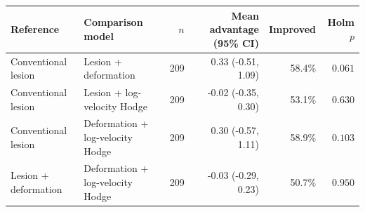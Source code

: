 \begin{tabular}{llrrrr}
\toprule
Reference & Comparison model & $n$ & Mean advantage (95\% CI) & Improved & Holm $p$ \\
\midrule
Conventional lesion & Lesion + deformation & 209 & 0.33 (-0.51, 1.09) & 58.4\% & \(0.061\) \\
Conventional lesion & Lesion + log-velocity Hodge & 209 & -0.02 (-0.35, 0.30) & 53.1\% & \(0.630\) \\
Conventional lesion & Deformation + log-velocity Hodge & 209 & 0.30 (-0.57, 1.11) & 58.9\% & \(0.103\) \\
Lesion + deformation & Deformation + log-velocity Hodge & 209 & -0.03 (-0.29, 0.23) & 50.7\% & \(0.950\) \\
\bottomrule
\end{tabular}
